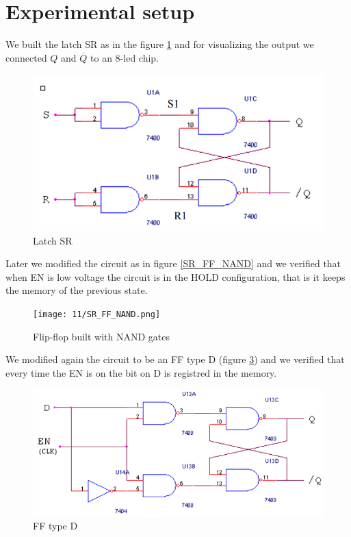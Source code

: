 \section{Experimental setup}
We built the latch SR as in the figure \ref{SR_NAND} and for visualizing the output we  connected $Q$ and $\overline{Q}$ to an 8-led chip.
\begin{figure}[H]
\centering
\includegraphics[width=.7\textwidth]{11/SR_NAND.png}
\caption{Latch SR}\label{SR_NAND}
\end{figure}
Later we modified the circuit as in figure \ref{SR_FF_NAND} and we verified that when EN is low voltage the circuit is in the HOLD configuration, that is it keeps the memory of the previous state. 
\begin{figure}[H]
\centering
\texttt{[image: 11/SR\_FF\_NAND.png]}
\caption{Flip-flop built with NAND gates}\label{FF_SR_NAND}

\end{figure}
We modified again the circuit to be an FF type D (figure \ref{D_FF}) and we verified that every time the EN is on the bit on D is registred in the memory.
\begin{figure}[H]
\centering
\includegraphics[width=.7\textwidth]{11/D_FF.png}
\caption{FF type D}\label{D_FF}

\end{figure}

